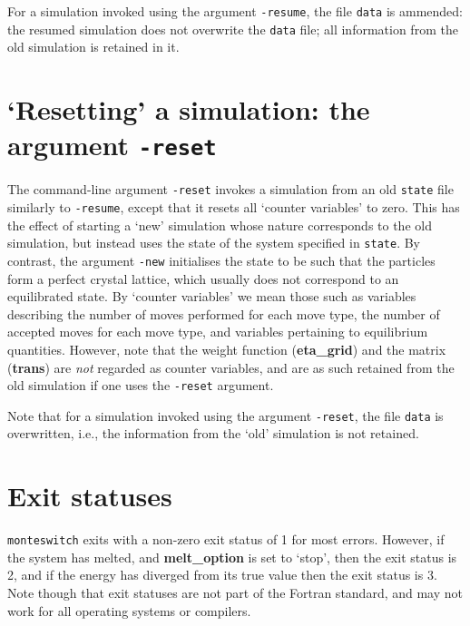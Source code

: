 \documentclass{report}
\begin{document}
For a simulation invoked using the argument \texttt{-resume}, the file \texttt{data} is ammended: the resumed simulation does not overwrite the
\texttt{data} file; all information from the old simulation is retained in it.

\section{`Resetting' a simulation: the argument \texttt{-reset}}\label{sec:reset}
The command-line argument \texttt{-reset} invokes a simulation from an old \texttt{state} file similarly to \texttt{-resume}, except that it
resets all `counter variables' to zero. This has the effect of starting a `new' simulation whose nature corresponds to the old simulation, 
but instead uses the state of the system specified in \texttt{state}. By contrast, the argument \texttt{-new} initialises the 
state to be such that the particles form a perfect crystal lattice, which usually does not correspond to an equilibrated state.
By `counter variables' we mean those such as variables describing the number of moves performed for each move type, the number of accepted moves 
for each move type, and variables pertaining to equilibrium quantities. However, note that the weight function (\textbf{eta\_grid}) and the
matrix (\textbf{trans}) are \emph{not} regarded as counter variables, and are as such retained from the old simulation
if one uses the \texttt{-reset} argument.

Note that for a simulation invoked using the argument \texttt{-reset}, the file \texttt{data} is overwritten, i.e., the information from the `old'
simulation is not retained.


\section{Exit statuses}
\texttt{monteswitch} exits with a non-zero exit status of 1 for most errors. However, if the system has melted, and \textbf{melt\_option} is set to
`stop', then the exit status is 2, and if the energy has diverged from its true value then the exit status is 3. 
Note though that exit statuses are not part of the Fortran standard, and may not work for all operating systems or compilers. 
\end{document}

